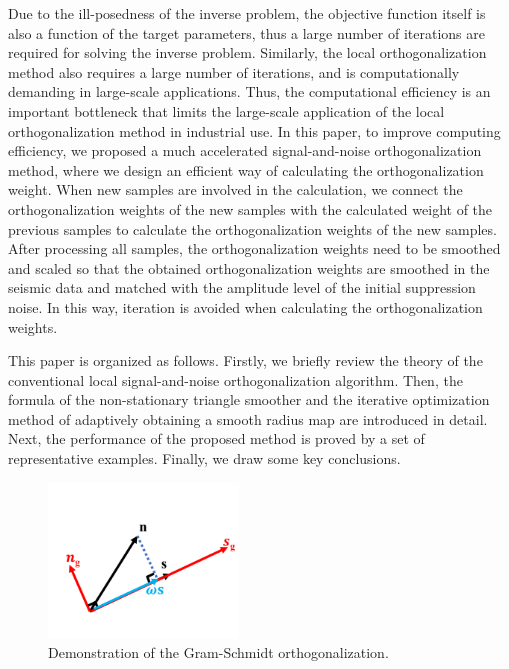 Due to the ill-posedness of the inverse problem, the objective function itself is also a function of the target parameters, thus a large number of iterations are required for solving the inverse problem. Similarly, the local orthogonalization method also requires a large number of iterations, and is computationally demanding in large-scale applications. Thus, the computational efficiency is an important bottleneck that limits the large-scale application of the local orthogonalization method in industrial use.  In this paper, to improve computing efficiency, we proposed a much accelerated signal-and-noise orthogonalization method, where we design an efficient way of calculating the orthogonalization weight. When new samples are involved in the calculation, we connect the orthogonalization weights of the new samples with the calculated weight of the previous samples to calculate the orthogonalization weights of the new samples. After processing all samples, the orthogonalization weights need to be smoothed and scaled so that the obtained orthogonalization weights are smoothed in the seismic data and matched with the amplitude level of the initial suppression noise. In this way, iteration is avoided when calculating the orthogonalization weights.

This paper is organized as follows. Firstly, we briefly review the theory of the conventional local signal-and-noise orthogonalization algorithm.  Then, the formula of the non-stationary triangle smoother and the iterative optimization method of adaptively obtaining a smooth radius map are introduced in detail. Next, the performance of the proposed method is proved by a set of representative examples. Finally, we draw some key conclusions.

\begin{figure}[htb!]
\centering
\includegraphics[width=0.45\textwidth]{Fig/demo_vec2}
\caption{Demonstration of the Gram-Schmidt orthogonalization.}
\label{fig:demo_vec2}
\end{figure}


